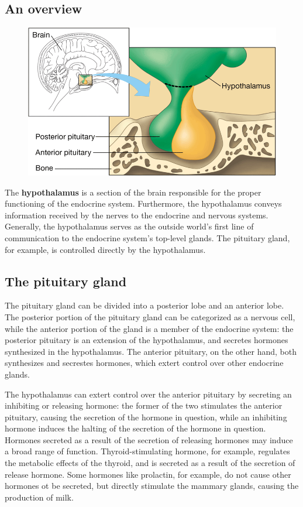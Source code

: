 \documentclass{article}
\begin{document}
\subsection{An overview}

\begin{figure}
	\centering
	\includegraphics[width=0.9\linewidth]{hypothalamus.png}
\end{figure}

The \textbf{hypothalamus} is a section of the brain responsible for the proper
functioning of the endocrine system. Furthermore, the hypothalamus conveys
information received by the nerves to the endocrine and nervous systems.
Generally, the hypothalamus serves as the outside world's first line of
communication to the endocrine system's top-level glands. The pituitary gland,
for example, is controlled directly by the hypothalamus.

\subsection{The pituitary gland}

The pituitary gland can be divided into a posterior lobe and an anterior lobe.
The posterior portion of the pituitary gland can be categorized as a nervous
cell, while the anterior portion of the gland is a member of the endocrine system:
the posterior pituitary is an extension of the hypothalamus, and secretes hormones
synthesized in the hypothalamus. The anterior pituitary, on the other hand, both
synthesizes and secrestes hormones, which extert control over other endocrine glands.

The hypothalamus can extert control over the anterior pituitary by secreting
an inhibiting or releasing hormone: the former of the two stimulates the
anterior pituitary, causing the secretion of the hormone in question, while
an inhibiting hormone induces the halting of the secretion of the hormone
in question. Hormones secreted as a result of the secretion of releasing
hormones may induce a broad range of function. Thyroid-stimulating hormone, for
example, regulates the metabolic effects of the thyroid, and is secreted as a
result of the secretion of release hormone. Some hormones like prolactin, for
example, do not cause other hormones ot be secreted, but directly stimulate
the mammary glands, causing the production of milk.
\end{document}
